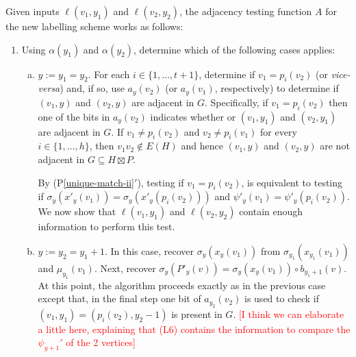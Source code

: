 \documentclass{patmorin}
\newcommand{\psref}[1]{(P\ref{#1}$'$)}
\begin{document}
Given inputs $\ell(v_1,y_1)$ and $\ell(v_2,y_2)$, the adjacency testing function $A$ for the new labelling scheme works as follows:
\begin{enumerate}
    \item Using $\alpha(y_1)$ and $\alpha(y_2)$, determine which of the following cases applies:
    \begin{enumerate}[(a)]
        \item $y:=y_1=y_2$.  For each $i\in\{1,\ldots,t+1\}$, determine if $v_1=p_i(v_2)$ (or \textit{vice-versa}) and, if so, use $a_y(v_2)$ (or $a_y(v_1)$, respectively) to determine if $(v_1,y)$ and $(v_2,y)$ are adjacent in $G$. Specifically, if $v_1=p_i(v_2)$ then one of the bits in $a_y(v_2)$ indicates whether or $(v_1,y_1)$ and $(v_2,y_1)$ are adjacent in $G$. If $v_1\neq p_i(v_2)$ and $v_2\neq p_i(v_1)$ for every $i\in\{1,\ldots,h\}$, then $v_1v_2\not\in E(H)$ and hence $(v_1,y)$ and $(v_2,y)$ are not adjacent in $G\subseteq H\boxtimes P$.

        By \psref{unique-match-ii}, testing if $v_1=p_i(v_2)$, is equivalent to testing if $\sigma_y(x'_y(v_1))=\sigma_y(x'_y(p_i(v_2)))$ and $\psi'_y(v_1)=\psi'_y(p_i(v_2))$. We now show that $\ell(v_1,y_1)$ and $\ell(v_2,y_2)$ contain enough information to perform this test.

        \item $y:=y_2=y_1+1$.  In this case, recover $\sigma_y(x_y(v_1))$ from $\sigma_{y_1}(x_{y_1}(v_1))$ and $\mu_{y_1}(v_1)$.  Next, recover $\sigma_y(P'_y(v))=\sigma_y(x_y(v_1))\mathbin{\circ}b_{y_1+1}(v)$. At this point, the algorithm proceeds exactly as in the previous case except that, in the final step one bit of $a_{y_2}(v_2)$ is used to check if $(v_1,y_1)=(p_i(v_2),y_2-1)$ is present in $G$.  \textcolor{red}{[I think we can elaborate a little here, explaining that (L6) contains the information to compare the $\psi_{y+1}'$ of the 2 vertices]}


\end{enumerate}
\end{enumerate}
\end{document}
